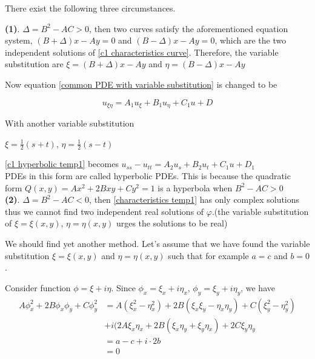 	There exist the following three circumstances.
	
	\textbf{(1)}. $\Delta = B^2 - AC > 0$, then two curves satisfy the aforementioned equation system, $(B + \Delta)x - Ay = 0$ and $(B - \Delta)x - Ay = 0$, which are the two independent solutions of \eqref{c1 characteristics curve}. Therefore, the variable substitution are $\xi = (B + \Delta)x - Ay$ and $\eta = (B - \Delta)x - Ay$
	
	Now equation \eqref{common PDE with variable substitution} is changed to be 
	
	\begin{equation}
		u_{\xi\eta} = A_1u_{\xi} + B_1u_{\eta} + C_1u + D
		\label{c1 hyperbolic temp1}
	\end{equation}
	
	With another variable substitution
	
	\begin{center}
		$\xi =\frac{1}{2}(s + t) $, $\eta = \frac{1}{2}(s - t)$
	\end{center}
	
	\eqref{c1 hyperbolic temp1} becomes $u_{ss} - u_{tt} = A_2u_s + B_2u_t + C_1u + D_1$\\
	
	PDEs in this form are called hyperbolic PDEs. This is because the quadratic form $Q(x, y) = Ax^2 + 2Bxy + Cy^2 = 1$ is a hyperbola when $B^2 - AC > 0$\\
	
	\textbf{(2)}. $\Delta = B^2 - AC < 0$, then \eqref{characteristics temp1} has only complex solutions thus we cannot find two independent real solutions of $\varphi$.(the variable substitution of $\xi = \xi(x, y)$, $\eta = \eta(x, y)$ urges the solutions to be real)
	
	We should find yet another method. Let's assume that we have found the variable substitution $\xi = \xi(x, y)$ and $\eta = \eta(x, y)$ such that for example $a = c$ and $b = 0$.
	
	Consider function $\phi = \xi + i\eta$. Since $\phi_x = \xi_x + i\eta_x$, $\phi_y = \xi_y + i\eta_y$, we have 
	\begin{align*}
		A\phi_x^2 + 2B\phi_x\phi_y + C\phi_y^2 &= A(\xi_x^2 - \eta_x^2) + 2B(\xi_x\xi_y - \eta_x\eta_y) + C(\xi_y^2 - \eta_y^2) \\
		&+ i(2A\xi_x\eta_x + 2B(\xi_x\eta_y + \xi_y\eta_x) + 2C\xi_y\eta_y\\
		&= a - c + i\cdot 2b\\
		&= 0
	\end{align*}
	
